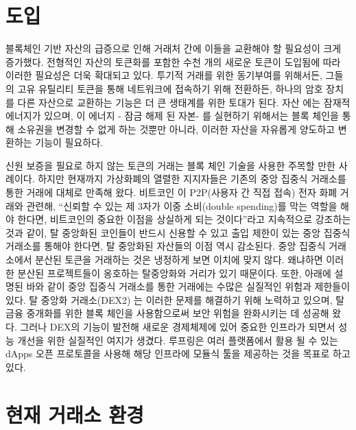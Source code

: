 \documentclass{article}
\begin{document}
\begin{multicols}{2}
\linespread{1.5}
\section{도입\label{sec:introduction}}

블록체인 기반 자산의 급증으로 인해 거래처 간에 이들을 교환해야 할 필요성이 크게 증가했다. 전형적인 자산의 토큰화를 포함한 수천 개의 새로운 토큰이 도입됨에 따라 이러한 필요성은 더욱 확대되고 있다. 투기적 거래를 위한 동기부여를 위해서든, 그들의 고유 유틸리티 토큰을 통해 네트워크에 접속하기 위해 전환하든, 하나의 암호 장치를 다른 자산으로 교환하는 기능은 더 큰 생태계를 위한 토대가 된다. 자산 \cite{desotocapital}에는 잠재적 에너지가 있으며, 이 에너지 - 잠금 해제 된 자본- 를 실현하기 위해서는 블록 체인을 통해 소유권을 변경할 수 없게 하는 것뿐만 아니라, 이러한 자산을 자유롭게 양도하고 변환하는 기능이 필요하다. 

신원 보증을 필요로 하지 않는 토큰의 거래는 블록 체인 기술을 사용한 주목할 만한 사례이다. 하지만 현재까지 가상화폐의 열렬한 지지자들은 기존의 중앙 집중식 거래소를 통한 거래에 대체로 만족해 왔다. 비트코인 \cite{nakamoto2008bitcoin}이 P2P(사용자 간 직접 접속) 전자 화폐 거래와 관련해, “신뢰할 수 있는 제 3자가 이중 소비(double spending)를 막는 역할을 해야 한다면, 비트코인의 중요한 이점을 상실하게 되는 것이다”라고 지속적으로 강조하는 것과 같이, 탈 중앙화된 코인들이 반드시 신용할 수 있고 출입 제한이 있는 중앙 집중식 거래소를 통해야 한다면, 탈 중앙화된 자산들의 이점 역시 감소된다. 중앙 집중식 거래소에서 분산된 토큰을 거래하는 것은 냉정하게 보면 이치에 맞지 않다. 왜냐하면 이러한 분산된 프로젝트들이 옹호하는 탈중앙화와 거리가 있기 때문이다. 또한, 아래에 설명된 바와 같이 중앙 집중식 거래소를 통한 거래에는 수많은 실질적인 위험과 제한들이 있다. 탈 중앙화 거래소(DEX2) \cite{schuh2015bitshares} \cite{bancor} \cite{kyber}는 이러한 문제를 해결하기 위해 노력하고 있으며, 탈 금융 중개화를 위한 블록 체인을 사용함으로써 보안 위험을 완화시키는 데 성공해 왔다. 그러나 DEX의 기능이 발전해 새로운 경제체제에 있어 중요한 인프라가 되면서 성능 개선을 위한 실질적인 여지가 생겼다. 루프링은 여러 플랫폼에서 활용 될 수 있는 dApps 오픈 프로토콜을 사용해 해당 인프라에 모듈식 툴을 제공하는 것을 목표로 하고 있다.

	
	
\section{현재 거래소 환경\label{sec:current_exchange_landscape}}


\end{multicols}
\end{document}
